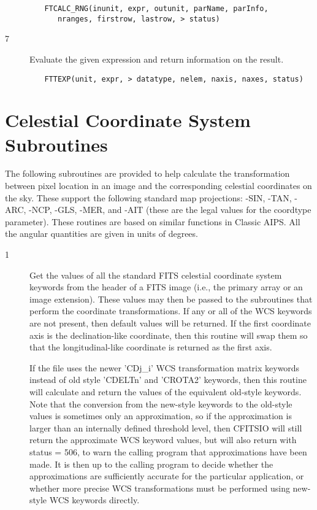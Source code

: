 \documentclass[11pt]{book}
\begin{document}
\begin{verbatim}
         FTCALC_RNG(inunit, expr, outunit, parName, parInfo,
            nranges, firstrow, lastrow, > status)
\end{verbatim}

\begin{description}
\item[7 ]Evaluate the given expression and return information on the result.
\end{description}

\begin{verbatim}
         FTTEXP(unit, expr, > datatype, nelem, naxis, naxes, status)
\end{verbatim}



\section{Celestial Coordinate System Subroutines \label{FTGICS}}

The following subroutines are provided to help calculate the
transformation between pixel location in an image and the corresponding
celestial coordinates on the sky.  These support the following standard
map projections:  -SIN, -TAN, -ARC, -NCP, -GLS, -MER, and -AIT (these
are the legal values for the coordtype parameter).  These routines are
based on similar functions in Classic AIPS.  All the angular quantities
are given in units of degrees.


\begin{description}
\item[1 ] Get the values of all the standard FITS celestial coordinate system
    keywords from the header of a FITS image (i.e., the primary array or
    an image extension).  These values may then be passed to the subroutines
    that perform the coordinate transformations.  If any or all of the WCS
    keywords are not present, then default values will be returned. If
    the first coordinate axis is the declination-like coordinate, then
    this routine will swap them so that the longitudinal-like coordinate
    is returned as the first axis.

    If the file uses the newer 'CDj\_i' WCS transformation matrix
    keywords instead of old style 'CDELTn' and 'CROTA2' keywords, then
    this routine will calculate and return the values of the equivalent
    old-style keywords.    Note that the conversion from the new-style
    keywords to the old-style values is sometimes only an
    approximation, so if the approximation is larger than an internally
    defined threshold level, then CFITSIO will still return the
    approximate WCS keyword values, but will also return with status =
    506, to warn the calling program that approximations have been
    made.  It is then up to the calling program to decide whether the
    approximations are sufficiently accurate for the particular
    application, or whether more precise WCS transformations must be
   performed using new-style WCS keywords directly.
\end{description}
\end{document}
